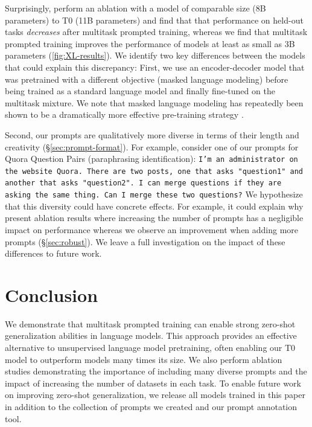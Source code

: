 Surprisingly, \citet{flan} perform an ablation with a model of comparable size (8B parameters) to T0 (11B parameters) and find that that performance on held-out tasks \textit{decreases} after multitask prompted training, whereas we find that multitask prompted training improves the performance of models at least as small as 3B parameters (\autoref{fig:XL-results}). We identify two key differences between the models that could explain this discrepancy: First, we use an encoder-decoder model that was pretrained with a different objective (masked language modeling) before being trained as a standard language model and finally fine-tuned on the multitask mixture. We note that masked language modeling has repeatedly been shown to be a dramatically more effective pre-training strategy \citep{t5,baevski2019cloze,devlin2019bert}.

Second, our prompts are qualitatively more diverse in terms of their length and creativity (\S\ref{sec:prompt-format}). For example, consider one of our prompts for Quora Question Pairs (paraphrasing identification): \texttt{I'm an administrator on the website Quora. There are two posts, one that asks "question1" and another that asks "question2". I can merge questions if they are asking the same thing. Can I merge these two questions?} We hypothesize that this diversity could have concrete effects. For example, it could explain why \citet{flan} present ablation results where increasing the number of prompts has a negligible impact on performance whereas we observe an improvement when adding more prompts (\S\ref{sec:robust}). We leave a full investigation on the impact of these differences to future work.

\section{Conclusion}

We demonstrate that multitask prompted training can enable strong zero-shot generalization abilities in language models. This approach provides an effective alternative to unsupervised language model pretraining, often enabling our T0 model to outperform models many times its size. We also perform ablation studies demonstrating the importance of including many diverse prompts and the impact of increasing the number of datasets in each task. To enable future work on improving zero-shot generalization, we release all models trained in this paper in addition to the collection of prompts we created and our prompt annotation tool.


